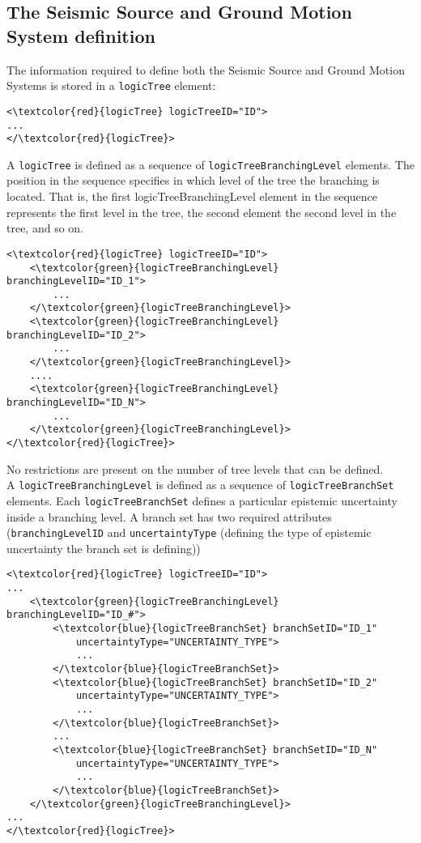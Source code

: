 \subsection{The Seismic Source and Ground Motion System definition}
The information required to define both the Seismic Source and Ground Motion Systems is stored in a \Verb+logicTree+ element: 
\begin{Verbatim}[frame=single, commandchars=\\\{\}]
<\textcolor{red}{logicTree} logicTreeID="ID">
...
</\textcolor{red}{logicTree}>
\end{Verbatim}
A \Verb+logicTree+ is defined as a sequence of \Verb+logicTreeBranchingLevel+ elements. The position in the sequence specifies in which level of the tree the branching is located. That is, the first logicTreeBranchingLevel element in the sequence represents the first level in the tree, the second element the second level in the tree, and so on.
\begin{Verbatim}[frame=single, commandchars=\\\{\}]
<\textcolor{red}{logicTree} logicTreeID="ID">
	<\textcolor{green}{logicTreeBranchingLevel} branchingLevelID="ID_1">
		...
	</\textcolor{green}{logicTreeBranchingLevel}>
	<\textcolor{green}{logicTreeBranchingLevel} branchingLevelID="ID_2">
		...
	</\textcolor{green}{logicTreeBranchingLevel}>
	....
	<\textcolor{green}{logicTreeBranchingLevel} branchingLevelID="ID_N">
		...
	</\textcolor{green}{logicTreeBranchingLevel}>
</\textcolor{red}{logicTree}>
\end{Verbatim}
No restrictions are present on the number of tree levels that can be defined.\\
A \Verb+logicTreeBranchingLevel+ is defined as a sequence of \Verb+logicTreeBranchSet+ elements. Each \Verb+logicTreeBranchSet+ defines a particular epistemic uncertainty inside a branching level. A branch set has two required attributes (\Verb+branchingLevelID+ and \Verb+uncertaintyType+ (defining the type of epistemic uncertainty the branch set is defining))
\begin{Verbatim}[frame=single, commandchars=\\\{\}]
<\textcolor{red}{logicTree} logicTreeID="ID">
...
	<\textcolor{green}{logicTreeBranchingLevel} branchingLevelID="ID_#">
		<\textcolor{blue}{logicTreeBranchSet} branchSetID="ID_1"
			uncertaintyType="UNCERTAINTY_TYPE">
			...
		</\textcolor{blue}{logicTreeBranchSet}>
		<\textcolor{blue}{logicTreeBranchSet} branchSetID="ID_2"
			uncertaintyType="UNCERTAINTY_TYPE">
			...
		</\textcolor{blue}{logicTreeBranchSet}>
		...
		<\textcolor{blue}{logicTreeBranchSet} branchSetID="ID_N"
			uncertaintyType="UNCERTAINTY_TYPE">
			...
		</\textcolor{blue}{logicTreeBranchSet}>
	</\textcolor{green}{logicTreeBranchingLevel}>
...
</\textcolor{red}{logicTree}>
\end{Verbatim}
